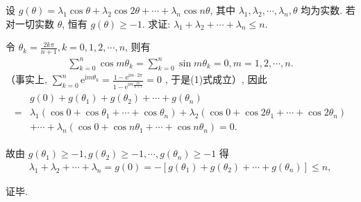 \begin{exercise}
	设 $g(\theta)=\lambda_1 \cos \theta+\lambda_2 \cos 2 \theta+\cdots+\lambda_n \cos n \theta$, 其中 $\lambda_1, \lambda_2, \cdots, \lambda_n, \theta$ 均为实数. 若对一切实数 $\theta$, 恒有 $g(\theta) \geqslant-1$. 求证: $\lambda_1+\lambda_2+\cdots+\lambda_n \leqslant n$.
\end{exercise}
\begin{solution}
	令 $\theta_k=\frac{2 k \pi}{n+1}, k=0,1,2, \cdots, n$, 则有
	\begin{align*}
		\sum_{k=0}^n \cos m \theta_k=\sum_{k=0}^n \sin m \theta_k=0, m=1,2, \cdots, n .
	\end{align*}
	（事实上,  $\sum_{k=0}^n \mathrm{e}^{\mathrm{i} m \theta_k}=\frac{1-\mathrm{e}^{\mathrm{i} m \cdot 2 \pi}}{1-\mathrm{e}^{\mathrm{i} m \frac{2 \pi}{n+1}}}=0$ , 于是(1)式成立）, 因此
	\begin{align*}
		\begin{aligned}
			  & g(0)+g\left(\theta_1\right)+g\left(\theta_2\right)+\cdots+g\left(\theta_n\right)                                                    \\
			= & \lambda_1\left(\cos 0+\cos \theta_1+\cdots+\cos \theta_n\right)+\lambda_2\left(\cos 0+\cos 2 \theta_1+\cdots+\cos 2 \theta_n\right) \\
			  & +\cdots+\lambda_n\left(\cos 0+\cos n \theta_1+\cdots+\cos n \theta_n\right)=0 .
		\end{aligned}
	\end{align*}

	故由 $g\left(\theta_1\right) \geqslant-1, g\left(\theta_2\right) \geqslant-1, \cdots, g\left(\theta_n\right) \geqslant-1$ 得
	\begin{align*}
		\lambda_1+\lambda_2+\cdots+\lambda_n=g(0)=-\left[g\left(\theta_1\right)+g\left(\theta_2\right)+\cdots+g\left(\theta_n\right)\right] \leqslant n,
	\end{align*}

	证毕.
\end{solution}

